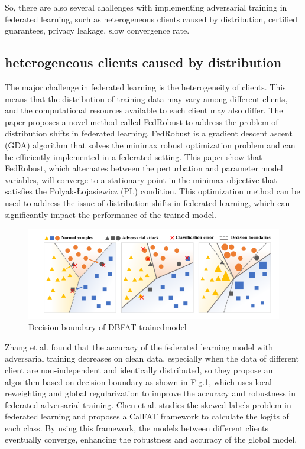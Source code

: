 \documentclass[conference]{IEEEtran}
\begin{document}
So, there are also several challenges with implementing adversarial training in federated learning,
such as heterogeneous clients caused by distribution, certified guarantees, privacy leakage, slow convergence rate.


\subsection{heterogeneous clients caused by distribution}  
The major challenge in federated learning is the heterogeneity of clients.  
This means that the distribution of training data may vary among different clients, 
and the computational resources available to each client may also differ.
The paper\cite{b101} proposes a novel method called FedRobust to address the problem of
distribution shifts in federated learning. FedRobust is a gradient descent ascent
(GDA) algorithm that solves the minimax robust optimization problem and can be
efficiently implemented in a federated setting. This paper show that FedRobust,
which alternates between the perturbation and parameter model variables,
will converge to a stationary point in the minimax objective that satisfies
the Polyak-Łojasiewicz (PL) \cite{b102} condition. This optimization method can be used
to address the issue of distribution shifts in federated learning,
which can significantly impact the performance of the trained model.


\begin{figure}[htbp]
    \centerline{\includegraphics[width=1.0\linewidth,height=0.4\linewidth]{picture/db.png}}
    \caption{Decision boundary of DBFAT-trainedmodel}
    \label{fig19}
\end{figure}

Zhang et al.\cite{b34} found that the accuracy of the federated learning model with
adversarial training decreases on clean data, especially when the data of different
client are non-independent and identically distributed, so they propose an algorithm
based on decision boundary as shown in Fig.\ref{fig19}, which uses local reweighting and global regularization
to improve the accuracy and robustness in federated adversarial training.
Chen et al.\cite{b32} studies the skewed labels problem in federated learning and proposes
a CalFAT framework to calculate the logits of each class. By using this framework, the models between different clients eventually converge, 
enhancing the robustness and accuracy of the global model.
\end{document}

